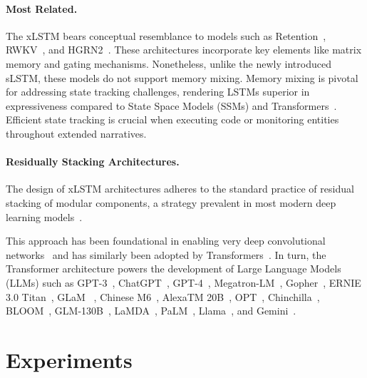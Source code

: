 \paragraph{Most Related.} The xLSTM bears conceptual resemblance to models such as Retention~\citep{Sun:23arxiv}, RWKV~\citep{Peng:23arxivshort,Peng:24arxivshort}, and HGRN2~\citep{Qin:24arxiv}. These architectures incorporate key elements like matrix memory and gating mechanisms. Nonetheless, unlike the newly introduced sLSTM, these models do not support memory mixing. Memory mixing is pivotal for addressing state tracking challenges, rendering LSTMs superior in expressiveness compared to State Space Models (SSMs) and Transformers~\citep{Merrill:24,Deletang:23}. Efficient state tracking is crucial when executing code or monitoring entities throughout extended narratives.

\paragraph{Residually Stacking Architectures.} The design of xLSTM architectures adheres to the standard practice of residual stacking of modular components, a strategy prevalent in most modern deep learning models~\citep{Srivastava:15,He:16}.

This approach has been foundational in enabling very deep convolutional networks~\citep{He:16} and has similarly been adopted by Transformers~\citep{Vaswani:17}. In turn, the Transformer architecture powers the development of Large Language Models (LLMs) such as GPT-3~\citep{Brown:20short}, ChatGPT~\citep{Schulman:22short}, GPT-4~\citep{Achiam:23gpt4short}, Megatron-LM~\citep{Shoeybi:19}, Gopher~\citep{Rae:21short}, ERNIE 3.0 Titan~\citep{Wang:21arxivshort}, GLaM ~\citep{Du:21glamshort}, Chinese M6~\citep{Lin:21}, AlexaTM 20B~\citep{Soltan:22}, OPT~\citep{Zhang:22opt}, Chinchilla~\citep{Hoffmann:22short}, BLOOM~\citep{Scao:22arxivshort}, GLM-130B~\citep{Zeng:22arxivshort}, LaMDA~\citep{Thoppilan:22short}, PaLM~\citep{Chowdhery:22short}, Llama~\citep{Touvron:23arxiv}, and Gemini~\citep{GeminiTeam:23arxiv,Reid:24arxiv}.

\section{Experiments}
\label{sec:Exp}

